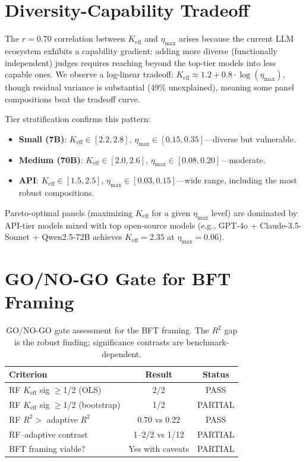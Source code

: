 \documentclass[11pt,a4paper]{article}
\newcommand{\etamax}{\ensuremath{\eta_{\max}}}
\newcommand{\keff}{\ensuremath{K_{\text{eff}}}}
\begin{document}
%

\appendix

\section{Diversity-Capability Tradeoff}
\label{app:tradeoff}

The $r=0.70$ correlation between $\keff$ and $\etamax$ arises because the current LLM ecosystem exhibits a capability gradient: adding more diverse (functionally independent) judges requires reaching beyond the top-tier models into less capable ones. We observe a log-linear tradeoff: $\keff \approx 1.2 + 0.8 \cdot \log(\etamax)$, though residual variance is substantial (49\% unexplained), meaning some panel compositions beat the tradeoff curve.

Tier stratification confirms this pattern:
\begin{itemize}
\item \textbf{Small (7B)}: $\keff \in [2.2, 2.8]$, $\etamax \in [0.15, 0.35]$---diverse but vulnerable.
\item \textbf{Medium (70B)}: $\keff \in [2.0, 2.6]$, $\etamax \in [0.08, 0.20]$---moderate.
\item \textbf{API}: $\keff \in [1.5, 2.5]$, $\etamax \in [0.03, 0.15]$---wide range, including the most robust compositions.
\end{itemize}

Pareto-optimal panels (maximizing $\keff$ for a given $\etamax$ level) are dominated by API-tier models mixed with top open-source models (e.g., GPT-4o + Claude-3.5-Sonnet + Qwen2.5-72B achieves $\keff=2.35$ at $\etamax=0.06$).

\section{GO/NO-GO Gate for BFT Framing}
\label{app:gate}

\begin{table}[h]
\centering
\small
\begin{tabular}{lcc}
\toprule
\textbf{Criterion} & \textbf{Result} & \textbf{Status} \\
\midrule
RF $\keff$ sig $\geq$1/2 (OLS) & 2/2 & PASS \\
RF $\keff$ sig $\geq$1/2 (bootstrap) & 1/2 & PARTIAL \\
RF $R^2 >$ adaptive $R^2$ & 0.70 vs 0.22 & PASS \\
RF--adaptive contrast & 1--2/2 vs 1/12 & PARTIAL \\
BFT framing viable? & Yes with caveats & PARTIAL \\
\bottomrule
\end{tabular}
\caption{GO/NO-GO gate assessment for the BFT framing. The $R^2$ gap is the robust finding; significance contrasts are benchmark-dependent.}
\label{tab:gate}
\end{table}
\end{document}
